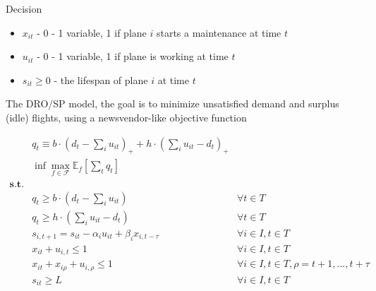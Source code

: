 \documentclass[
  a4paper,
,tablecaptionabove
]{scrartcl}
\numberwithin{equation}{section}
\providecommand{\tightlist}{%
  \setlength{\itemsep}{0pt}\setlength{\parskip}{0pt}}
\renewenvironment{quote}{\begin{customblockquote}\list{}{\rightmargin=0em\leftmargin=0em}%
\item\relax\color{blockquote-text}\ignorespaces}{\unskip\unskip\endlist\end{customblockquote}}
\begin{document}
\begin{quote}
  Decision
\end{quote}

\begin{itemize}
  \tightlist
  \item
        \(x_{it}\) - 0 - 1 variable, 1 if plane \(i\) starts a maintenance at
        time \(t\)
  \item
        \(u_{it}\) - 0 - 1 variable, 1 if plane is working at time \(t\)
  \item
        \(s_{it} \ge 0\) - the lifespan of plane \(i\) at time \(t\)
\end{itemize}

The DRO/SP model, the goal is to minimize unsatisfied demand and surplus
(idle) flights, using a newsvendor-like objective function

\[\begin{aligned}
                  & q_t \equiv b \cdot (d_t - \sum_i u_{it})_+ + h \cdot  ( \sum_i u_{it} - d_t)_+                                                       \\
                  & \inf \max_{f\in \mathscr F}\mathbb E_f \left[ \sum_t q_t  \right]                                                                    \\
    \mathbf{s.t.} &                                                                                                                                      \\
                  & q_t \ge b\cdot \left (d_t - \sum_i u_{it} \right)                              & \forall t \in T                                     \\
                  & q_t \ge h\cdot \left (\sum_i u_{it} - d_t \right )                             & \forall t \in T                                     \\
                  & s_{i, t+1} =  s_{i t}  - \alpha_i  u_{it} + \beta_i  x_{i, t- \tau}            & \forall i \in I, t \in T                            \\
                  & x_{it} +  u_{i, t} \le 1                                                       & \forall i \in I, t \in T                            \\
                  & x_{it} + x_{i\rho} + u_{i, \rho} \le 1                                         & \forall i \in I,  t\in T, \rho = t + 1, ..., t+\tau \\
                  & s_{i t} \ge L                                                                  & \forall i \in I, t \in T
  \end{aligned}\]
\end{document}
